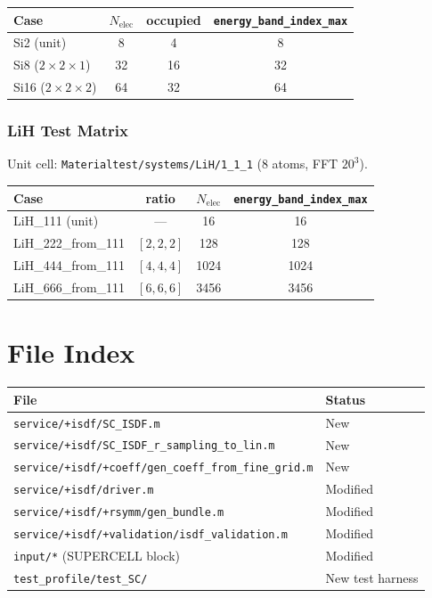 \documentclass[11pt,a4paper]{article}
\begin{document}
\begin{table}[h]
\centering
\begin{tabular}{lccc}
\toprule
Case & $N_{\mathrm{elec}}$ & occupied & \texttt{energy\_band\_index\_max} \\
\midrule
Si2 (unit)   &  8 &  4 &  8 \\
Si8 ($2\!\times\!2\!\times\!1$) & 32 & 16 & 32 \\
Si16 ($2\!\times\!2\!\times\!2$) & 64 & 32 & 64 \\
\bottomrule
\end{tabular}
\end{table}

\subsubsection{LiH Test Matrix}

Unit cell: \texttt{Materialtest/systems/LiH/1\_1\_1} ($8$ atoms, FFT $20^3$).

\begin{table}[h]
\centering
\begin{tabular}{lccc}
\toprule
Case & ratio & $N_{\mathrm{elec}}$ & \texttt{energy\_band\_index\_max} \\
\midrule
LiH\_111 (unit) & --- & 16 & 16 \\
LiH\_222\_from\_111 & $[2,2,2]$ & 128 & 128 \\
LiH\_444\_from\_111 & $[4,4,4]$ & 1024 & 1024 \\
LiH\_666\_from\_111 & $[6,6,6]$ & 3456 & 3456 \\
\bottomrule
\end{tabular}
\end{table}

\section{File Index}

\begin{table}[h]
\centering
\small
\begin{tabular}{ll}
\toprule
File & Status \\
\midrule
\texttt{service/+isdf/SC\_ISDF.m} & New \\
\texttt{service/+isdf/SC\_ISDF\_r\_sampling\_to\_lin.m} & New \\
\texttt{service/+isdf/+coeff/gen\_coeff\_from\_fine\_grid.m} & New \\
\texttt{service/+isdf/driver.m} & Modified \\
\texttt{service/+isdf/+rsymm/gen\_bundle.m} & Modified \\
\texttt{service/+isdf/+validation/isdf\_validation.m} & Modified \\
\texttt{input/*} (SUPERCELL block) & Modified \\
\texttt{test\_profile/test\_SC/} & New test harness \\
\bottomrule
\end{tabular}
\end{table}
\end{document}
